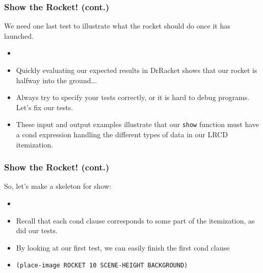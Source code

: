 \documentclass{beamer}
\begin{document}
\begin{frame}
  \frametitle{Show the Rocket! (cont.)}
  We need one last test to illustrate what the rocket should do once
  it has launched.
  \begin{itemize}
  \item<2-> \showTestThree
  \item<3-> Quickly evaluating our expected results in DrRacket
    shows that our rocket is halfway into the ground...
  \item<4-> Always try to specify your tests correctly, or it
    is hard to debug programs. Let's fix our tests.
  \item<5-> These input and output examples illustrate that our
    \texttt{show} function must have a cond expression
    handling the different types of data in our LRCD itemization.
  \end{itemize}
\end{frame}


\begin{frame}
  \frametitle{Show the Rocket! (cont.)}
  So, let's make a skeleton for show:
  \begin{itemize}
  \item<2-> \showSkeleton
  \item<3-> Recall that each cond clause corresponds to some part of the
    itemization, as did our tests.
  \item<4-> By looking at our first test, we can easily finish the first
    cond clause
  \item<5-> \texttt{(place-image ROCKET 10 SCENE-HEIGHT BACKGROUND)}
  \end{itemize}
\end{frame}

\end{document}
